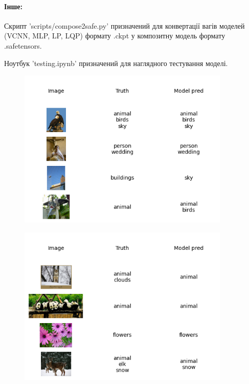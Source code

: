 \documentclass{udstu}
\begin{document}
\paragraph{\textbf{Інше:}\\}

Скрипт 'scripts/compose2safe.py' призначений для конвертації вагів моделей (VCNN, MLP, LP, LQP)
формату .ckpt у композитну модель формату .safetensors.

Ноутбук 'testing.ipynb' призначений для наглядного тестування моделі.



\begin{figure}[!ht]
	\centering
	\includegraphics[width=0.9\textwidth]{PNG/showcase-100}
	\caption{}
\end{figure}

\begin{figure}[!ht]
	\centering
	\includegraphics[width=0.9\textwidth]{PNG/showcase-125}
	\caption{}
\end{figure}
\end{document}
